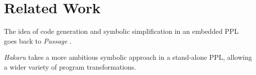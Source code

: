 \documentclass[anonymous=false, %
               format=acmsmall, %
               review=false, %
               screen=true, %
               nonacm=true]{acmart}
\begin{document}





  

  
  
  


\section{Related Work}

The idea of code generation and symbolic simplification in an embedded PPL goes back to \emph{Passage} \cite{Scherrer2012}. 

\emph{Hakaru} \cite{narayanan2016probabilistic} takes a more ambitious symbolic approach in a stand-alone PPL, allowing a wider variety of program transformations. 
\end{document}
